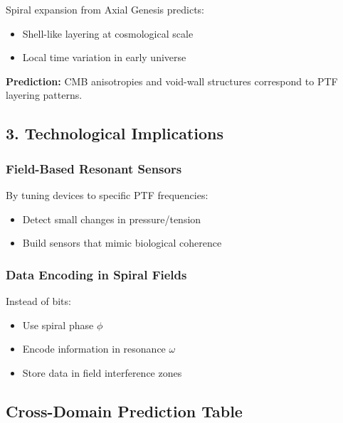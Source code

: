 \documentclass[a4paper,12pt]{article}
\begin{document}
Spiral expansion from Axial Genesis predicts:
\begin{itemize}
    \item Shell-like layering at cosmological scale
    \item Local time variation in early universe
\end{itemize}

\textbf{Prediction:}  
CMB anisotropies and void-wall structures correspond to PTF layering patterns.

\subsection{3. Technological Implications}

\subsubsection*{Field-Based Resonant Sensors}

By tuning devices to specific PTF frequencies:
\begin{itemize}
    \item Detect small changes in pressure/tension
    \item Build sensors that mimic biological coherence
\end{itemize}

\subsubsection*{Data Encoding in Spiral Fields}

Instead of bits:
\begin{itemize}
    \item Use spiral phase $\phi$
    \item Encode information in resonance $\omega$
    \item Store data in field interference zones
\end{itemize}

\subsection{Cross-Domain Prediction Table}
\end{document}

